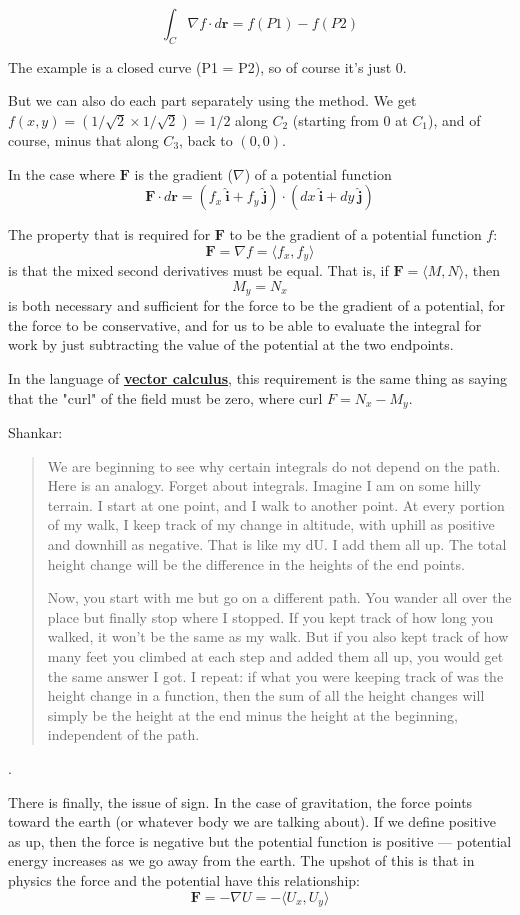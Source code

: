\documentclass[11pt, oneside]{article}   	%
\begin{document}
 \[ \int_C \nabla f \cdot d \mathbf{r} =   f(P1) - f(P2) \]
  
The example is a closed curve (P1 = P2), so of course it's just 0.  

But we can also do each part separately using the method.  We get $f(x,y) = (1/\sqrt{2} \times 1/\sqrt{2}) = 1/2$ along $C_2$ (starting from $0$ at $C_1$), and of course, minus that along $C_3$, back to $(0,0)$.

In the case where $\mathbf{F}$ is the gradient ($\nabla$) of a potential function
\[ \mathbf{F} \cdot d\mathbf{r} = (f_x \ \hat{\mathbf{i}} + f_y \ \hat{\mathbf{j}}) \cdot (dx \ \hat{\mathbf{i}} + dy \ \hat{\mathbf{j}} ) \]

The property that is required for $\mathbf{F}$ to be the gradient of a potential function $f$:
\[ \mathbf{F} = \nabla f = \langle f_x, f_y \rangle \]
is that the mixed second derivatives must be equal.  That is, if $\mathbf{F} = \langle M, N \rangle$, then
\[ M_y = N_x \]
is both necessary and sufficient for the force to be the gradient of a potential, for the force to be conservative, and for us to be able to evaluate the integral for work by just subtracting the value of the potential at the two endpoints.

In the language of \hyperref[sec:green]{\textbf{vector calculus}}, this requirement is the same thing as saying that the "curl" of the field must be zero, where curl $F = N_x - M_y$.

Shankar:

\begin{quote}We are beginning to see why certain integrals do not depend on the path. Here is an analogy. Forget about integrals. Imagine I am on some hilly terrain. I start at one point, and I walk to another point. At every portion of my walk, I keep track of my change in altitude, with uphill as positive and downhill as negative. That is like my dU. I add them all up. The total height change will be the difference in the heights of the end points. 

Now, you start with me but go on a different path. You wander all over the place but finally stop where I stopped. If you kept track of how long you walked, it won't be the same as my walk. But if you also kept track of how many feet you climbed at each step and added them all up, you would get the same answer I got. I repeat: if what you were keeping track of was the height change in a function, then the sum of all the height changes will simply be the height at the end minus the height at the beginning, independent of the path.\end{quote}.

There is finally, the issue of sign.  In the case of gravitation, the force points toward the earth (or whatever body we are talking about).  If we define positive as up, then the force is negative but the potential function is positive --- potential energy increases as we go away from the earth.  The upshot of this is that in physics the force and the potential have this relationship:
\[ \mathbf{F} = - \nabla U = - \langle U_x, U_y \rangle \]
\end{document}
